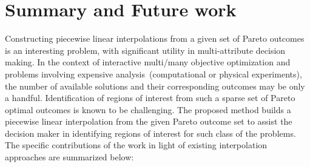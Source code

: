 \section{Summary and Future work}
\label{sec:sum}

Constructing piecewise linear interpolations from a given set of Pareto outcomes is an interesting problem, with significant utility in multi-attribute decision making. In the context of interactive multi/many objective optimization and problems involving expensive analysis~(computational or physical experiments), the number of available solutions and their corresponding outcomes may be only a handful. Identification of regions of interest from such a sparse set of Pareto optimal outcomes is known to be challenging. The proposed method builds a piecewise linear interpolation from the given Pareto outcome set to assist the decision maker in identifying regions of interest for such class of the problems. The specific contributions of the work in light of existing interpolation approaches are summarized below:

